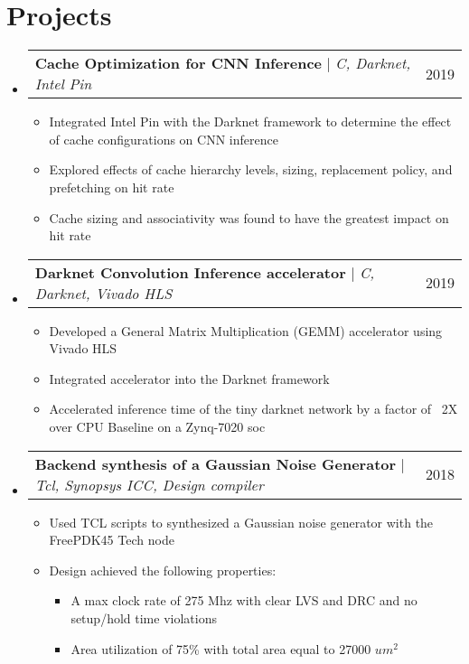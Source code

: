 \documentclass[letterpaper,11pt]{article}
\makeatletter
\newcommand{\resumeItem}[1]{
  \item\small{
    {#1 \vspace{-2pt}}
  }
}
\newcommand{\resumeProjectHeading}[2]{
    \item
    \begin{tabular*}{0.97\textwidth}{l@{\extracolsep{\fill}}r}
      \small#1 & #2 \\
    \end{tabular*}\vspace{-7pt}
}
\newcommand{\resumeSubHeadingListStart}{\begin{itemize}[leftmargin=0.15in, label={}]}
\newcommand{\resumeSubHeadingListEnd}{\end{itemize}}
\newcommand{\resumeItemListStart}{\begin{itemize}}
\newcommand{\resumeItemListEnd}{\end{itemize}\vspace{-5pt}}
\makeatother
\begin{document}
\section{Projects} %
    \resumeSubHeadingListStart
        \resumeProjectHeading
          {\textbf{Cache Optimization for CNN Inference } $|$ \emph{C, Darknet, Intel Pin}}{2019}
          \resumeItemListStart
            \resumeItem{Integrated Intel Pin with the Darknet framework to determine the effect of cache configurations on CNN inference}
            \resumeItem{Explored effects of cache hierarchy levels, sizing, replacement policy, and prefetching on hit rate} %
            \resumeItem{Cache sizing and associativity was found to have the greatest impact on hit rate} %
          \resumeItemListEnd
        \resumeProjectHeading
          {\textbf{Darknet Convolution Inference accelerator} $|$ \emph{C, Darknet, Vivado HLS}}{2019}
          \resumeItemListStart
            \resumeItem{Developed a General Matrix Multiplication (GEMM) accelerator using Vivado HLS}
            \resumeItem{Integrated accelerator into the Darknet framework}
            \resumeItem{Accelerated inference time of the tiny darknet network by a factor of ~2X over CPU Baseline on a Zynq-7020 soc}
          \resumeItemListEnd
        \resumeProjectHeading
        {\textbf{Backend synthesis of a Gaussian Noise Generator} $|$ \emph{Tcl, Synopsys ICC, Design compiler}}{2018}
        \resumeItemListStart
          \resumeItem{Used TCL scripts to synthesized a Gaussian noise generator with the FreePDK45 Tech node}
          \resumeItem{Design achieved the following properties: }
          \resumeItemListStart
            \resumeItem{A max clock rate of 275 Mhz with clear LVS and DRC and no setup/hold time violations}
            \resumeItem{Area utilization of 75\% with total area equal to 27000 $um^2$}
          \resumeItemListEnd
        \resumeItemListEnd
    \resumeSubHeadingListEnd
\end{document}
